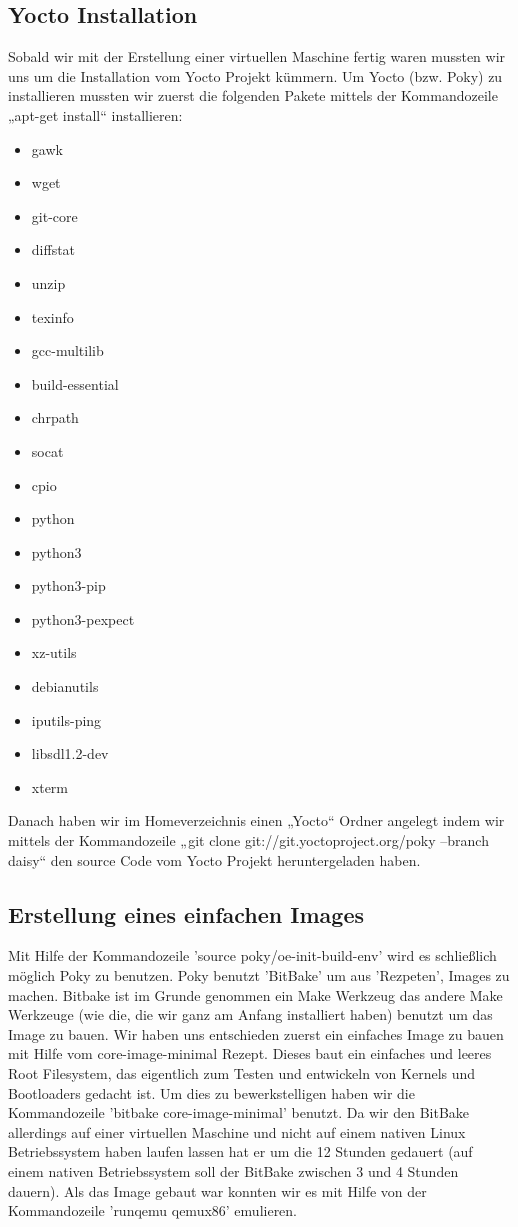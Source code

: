 \documentclass[a4paper,10pt] {article}
\begin{document}
\newpage
\subsection{Yocto Installation}

Sobald wir mit der Erstellung einer virtuellen Maschine fertig waren mussten wir uns um die Installation vom Yocto Projekt kümmern.
Um Yocto (bzw. Poky) zu installieren mussten wir zuerst die folgenden Pakete mittels der Kommandozeile „apt-get install“ installieren:
	\begin{itemize}
	\item gawk 
	\item wget 
	\item git-core 
	\item diffstat 
	\item unzip 
	\item texinfo 
	\item gcc-multilib 
	\item build-essential 
	\item chrpath 
	\item socat 
	\item cpio 
	\item python 
	\item python3 
	\item python3-pip
	\item python3-pexpect 
	\item xz-utils 
	\item debianutils 
	\item iputils-ping 
	\item libsdl1.2-dev 
	\item xterm
	\end{itemize}
Danach haben wir im Homeverzeichnis einen „Yocto“ Ordner angelegt indem wir mittels der Kommandozeile „git clone git://git.yoctoproject.org/poky --branch daisy“ den source Code vom Yocto Projekt heruntergeladen haben.


\subsection{Erstellung eines einfachen Images}
Mit Hilfe der Kommandozeile 'source poky/oe-init-build-env' wird es schließlich möglich Poky zu benutzen. Poky benutzt 'BitBake' um aus 'Rezpeten', Images zu machen. Bitbake ist im Grunde genommen ein Make Werkzeug das andere Make Werkzeuge (wie die, die wir ganz am Anfang installiert haben) benutzt um das Image zu bauen. 
Wir haben uns entschieden zuerst ein einfaches Image zu bauen mit Hilfe vom core-image-minimal Rezept. Dieses baut ein einfaches und leeres Root Filesystem, das eigentlich zum Testen und entwickeln von Kernels und Bootloaders gedacht ist. Um dies zu bewerkstelligen haben wir die Kommandozeile 'bitbake core-image-minimal' benutzt.
Da wir den BitBake allerdings auf einer virtuellen Maschine und nicht auf einem nativen Linux Betriebssystem haben laufen lassen hat er um die 12 Stunden gedauert (auf einem nativen Betriebssystem soll der BitBake zwischen 3 und 4 Stunden dauern).
Als das Image gebaut war konnten wir es mit Hilfe von der Kommandozeile 'runqemu qemux86' emulieren.
\end{document}

